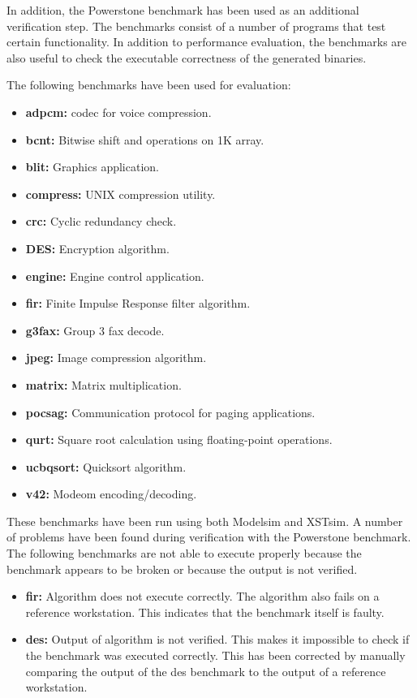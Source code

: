 In addition, the Powerstone benchmark \cite{Jeff-Scott:1998fj} has been used as an additional verification step. The benchmarks consist of a number of programs that test certain functionality. In addition to performance evaluation, the benchmarks are also useful to check the executable correctness of the generated binaries.

The following benchmarks have been used for evaluation:

\begin{itemize}
	\item \textbf{adpcm:} codec for voice compression.
	\item \textbf{bcnt:} Bitwise shift and operations on 1K array.
	\item \textbf{blit:} Graphics application.
	\item \textbf{compress:} UNIX compression utility.
	\item \textbf{crc:} Cyclic redundancy check.
	\item \textbf{DES:} Encryption algorithm.
	\item \textbf{engine:} Engine control application.
	\item \textbf{fir:} Finite Impulse Response filter algorithm.
	\item \textbf{g3fax:} Group 3 fax decode.
	\item \textbf{jpeg:} Image compression algorithm.
	\item \textbf{matrix:} Matrix multiplication.
	\item \textbf{pocsag:} Communication protocol for paging applications.
	\item \textbf{qurt:} Square root calculation using floating-point operations.
	\item \textbf{ucbqsort:} Quicksort algorithm.
	\item \textbf{v42:} Modeom encoding/decoding.
\end{itemize}

These benchmarks have been run using both Modelsim and XSTsim. A number of problems have been found during verification with the Powerstone benchmark. The following benchmarks are not able to execute properly because the benchmark appears to be broken or because the output is not verified.

\begin{itemize}
	\item \textbf{fir:} Algorithm does not execute correctly. The algorithm also fails on a reference workstation. This indicates that the benchmark itself is faulty.
	\item \textbf{des:} Output of algorithm is not verified. This makes it impossible to check if the benchmark was executed correctly. This has been corrected by manually comparing the output of the des benchmark to the output of a reference workstation.
\end{itemize}

